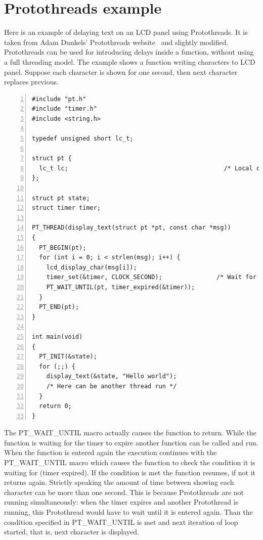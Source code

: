 
\chapter{Protothreads example}\label{app:protothreads}
Here is
an example of delaying text on an LCD panel using Protothreads.
It is taken from
Adam Dunkels' Protothreads website~\cite{adam-protothreads} and slightly modified.
Protothreads can be used for introducing delays inside a function, without using a full threading model.
The example shows a function writing characters to LCD panel.
Suppose each character is shown for one second, then next character replaces previous.
\begin{lstlisting}[numbers=left]
#include "pt.h"
#include "timer.h"
#include <string.h>

typedef unsigned short lc_t;

struct pt {
  lc_t lc;                                           /* Local continuation */
};

struct pt state;
struct timer timer;

PT_THREAD(display_text(struct pt *pt, const char *msg))
{
  PT_BEGIN(pt);
  for (int i = 0; i < strlen(msg); i++) {
    lcd_display_char(msg[i]);
    timer_set(&timer, CLOCK_SECOND);               /* Wait for one second. */
    PT_WAIT_UNTIL(pt, timer_expired(&timer));
  }
  PT_END(pt);
}

int main(void)
{
  PT_INIT(&state);
  for (;;) {
    display_text(&state, "Hello world");
    /* Here can be another thread run */
  }
  return 0;
}
\end{lstlisting}
The PT\_WAIT\_UNTIL macro actually causes the function to return.
While the function is waiting for the timer to expire another function can be called and run.
When the function is entered again the execution continues with the PT\_WAIT\_UNTIL macro
which causes the function to check the condition it is waiting for (timer expired).
If the condition is met the function resumes, if not it returns again.
Strictly speaking the amount of time between showing each character can
be more than one second.
This is because Protothreads are not running simultaneously: when the timer expires
and another Protothread is running, this Protothread would have to wait until
it is entered again. Than the condition specified in PT\_WAIT\_UNTIL is met and
next iteration of loop started, that is, next character is displayed.

